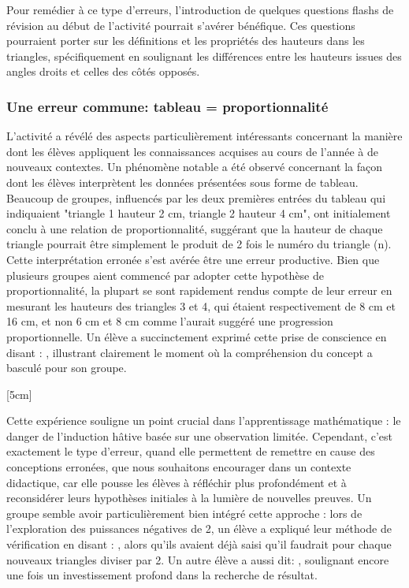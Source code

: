 Pour remédier à ce type d'erreurs,
l'introduction de quelques questions flashs de révision au début de l'activité pourrait s'avérer bénéfique.
Ces questions pourraient porter sur les définitions et les propriétés des hauteurs dans les triangles,
spécifiquement en soulignant les différences entre les hauteurs issues des angles droits et celles des côtés opposés.

\subsubsection{Une erreur commune: tableau = proportionnalité}

L'activité a révélé des aspects particulièrement intéressants concernant la manière dont les élèves appliquent les connaissances acquises au cours de l'année à de nouveaux contextes.
Un phénomène notable a été observé concernant la façon dont les élèves interprètent les données présentées sous forme de tableau.
Beaucoup de groupes,
influencés par les deux premières entrées du tableau qui indiquaient "triangle 1 hauteur 2 cm, triangle 2 hauteur 4 cm",
ont initialement conclu à une relation de proportionnalité,
suggérant que la hauteur de chaque triangle pourrait être simplement le produit de 2 fois le numéro du triangle (n).\\

Cette interprétation erronée s'est avérée être une erreur productive.
Bien que plusieurs groupes aient commencé par adopter cette hypothèse de proportionnalité,
la plupart se sont rapidement rendus compte de leur erreur en mesurant les hauteurs des triangles 3 et 4,
qui étaient respectivement de 8 cm et 16 cm,
et non 6 cm et 8 cm comme l'aurait suggéré une progression proportionnelle.
Un élève a succinctement exprimé cette prise de conscience en disant :
,
illustrant clairement le moment où la compréhension du concept a basculé pour son groupe.

[5cm]

Cette expérience souligne un point crucial dans l'apprentissage mathématique :
le danger de l'induction hâtive basée sur une observation limitée.
Cependant,
c'est exactement le type d'erreur,
quand elle permettent de remettre en cause des conceptions erronées,
que nous souhaitons encourager dans un contexte didactique,
car elle pousse les élèves à réfléchir plus profondément et à reconsidérer leurs hypothèses initiales à la lumière de nouvelles preuves.
Un groupe semble avoir particulièrement bien intégré cette approche :
lors de l'exploration des puissances négatives de 2,
un élève a expliqué leur méthode de vérification en disant :
,
alors qu'ils avaient déjà saisi qu'il faudrait pour chaque nouveaux triangles diviser par 2.
Un autre élève a aussi dit: ,
soulignant encore une fois un investissement profond dans la recherche de résultat.

